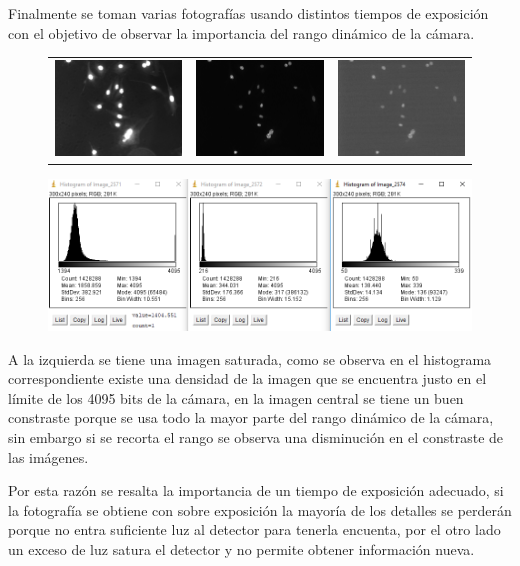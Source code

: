 \documentclass[addpoints,12pt]{exam}
\begin{document}
	Finalmente se toman varias fotografías usando distintos tiempos de exposición con el objetivo de observar la importancia del rango dinámico de la cámara.
	
	\begin{figure}[!h]
		\centering
		\begin{tabular}{ccc}
			\includegraphics[width = 0.3\linewidth]{Image_2571.jpg} &
			\includegraphics[width = 0.3\linewidth]{Image_2572.jpg} &
			\includegraphics[width = 0.3\linewidth]{Image_2574.jpg}
		\end{tabular}
		\includegraphics[width=0.9\linewidth]{hists.png}
	\end{figure}
	
	A la izquierda se tiene una imagen saturada, como se observa en el histograma correspondiente existe una densidad de la imagen que se encuentra justo en el límite de los 4095 bits de la cámara, en la imagen central se tiene un buen constraste porque se usa todo la mayor parte del rango dinámico de la cámara, sin embargo si se recorta el rango se observa una disminución en el constraste de las imágenes.
	
	Por esta razón se resalta la importancia de un tiempo de exposición adecuado, si la fotografía se obtiene con sobre exposición la mayoría de los detalles se perderán porque no entra suficiente luz al detector para tenerla encuenta, por el otro lado un exceso de luz satura el detector y no permite obtener información nueva. 
\end{document}
